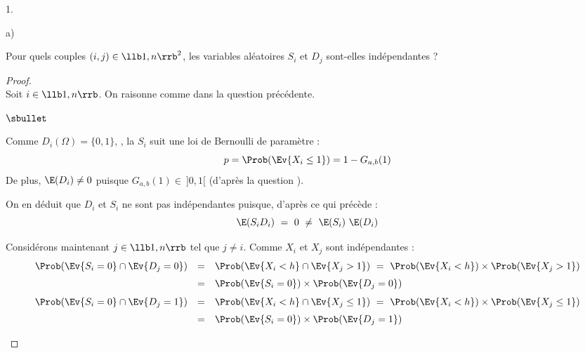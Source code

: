 \documentclass[11pt]{article}%
\begin{document}
\begin{noliste}{1.}
\begin{noliste}{a)}
  \item Pour quels couples $(i,j) \in \llb 1,n\rrb^2$, les variables
    aléatoires $S_i$ et $D_j$ sont-elles indépendantes ?

    \begin{proof}~\\
      Soit $i \in \llb 1,n\rrb$. On raisonne comme dans la question
      précédente.
      \begin{noliste}{$\sbullet$}
      \item Comme $D_i(\Omega) = \{0, 1\}$, , la \var $S_i$ suit une loi
      de Bernoulli de paramètre : 
      \[
	p= \Prob(\Ev{X_i \leq 1}) = 1-G_{a,b}(1)
      \]
        De plus, $\E(D_i) \neq 0$ puisque $G_{a, b}(1) \in \ ]0,1[$
        (d'après la question ).

      \item On en déduit que $D_i$ et $S_i$ ne sont pas indépendantes
        puisque, d'après ce qui précède :
        \[
        \E(S_i D_i) \ = \ 0 \ \neq \ \E(S_i) \ \E(D_i)
        \]

      \item Considérons maintenant $j \in \llb 1, n\rrb$ tel que $j
        \neq i$. Comme $X_i$ et $X_j$ sont indépendantes :
        \[
        \begin{array}{rcl}
          \Prob(\Ev{S_i = 0} \cap \Ev{D_j = 0}) & = & \Prob(\Ev{X_i < h}
          \cap \Ev{X_j > 1}) \ = \ \Prob(\Ev{X_i < h}) \times 
	  \Prob(\Ev{X_j > 1}) 
	  \\[.2cm]
	  &=& \Prob(\Ev{S_i=0}) \times \Prob(\Ev{D_j=0})
        \end{array}
        \]
        \[
          \begin{array}{rcl}
            \Prob(\Ev{S_i = 0} \cap \Ev{D_j = 1}) & = & \Prob(\Ev{X_i < 
	    h} \cap \Ev{X_j \leq 1}) \ = \ \Prob(\Ev{X_i < h}) \times
           \Prob(\Ev{X_j \leq 1}) 
           \\[.2cm]
           &=& \Prob(\Ev{S_i=0}) \times \Prob(\Ev{D_j=1})
          \end{array}
        \]
        

\end{noliste}
\end{proof}
\end{noliste}
\end{noliste}
\end{document}
